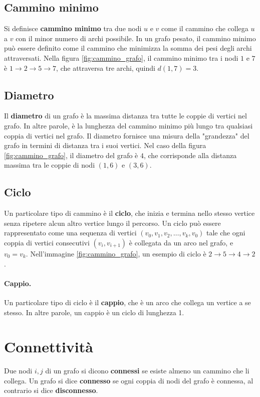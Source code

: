 \subsection{Cammino minimo} Si definisce \textbf{cammino minimo} tra due nodi \( u \) e \( v \) come il cammino che collega \( u \) a \( v \) con il minor numero di archi possibile. In un grafo pesato, il cammino minimo può essere definito come il cammino che minimizza la somma dei pesi degli archi attraversati. Nella figura \ref{fig:cammino_grafo}, il cammino minimo tra i nodi \(1\) e \(7\) è \(1 \to 2 \to 5 \to 7\), che attraversa tre archi, quindi $d(1, 7) = 3$.

\subsection{Diametro} Il \textbf{diametro} di un grafo è la massima distanza tra tutte le coppie di vertici nel grafo. In altre parole, è la lunghezza del cammino minimo più lungo tra qualsiasi coppia di vertici nel grafo. Il diametro fornisce una misura della "grandezza" del grafo in termini di distanza tra i suoi vertici. Nel caso della figura \ref{fig:cammino_grafo}, il diametro del grafo è \(4\), che corrisponde alla distanza massima tra le coppie di nodi \( (1, 6) \) e \( (3, 6) \).

\subsection{Ciclo}
Un particolare tipo di cammino è il \textbf{ciclo}, che inizia e termina nello stesso vertice senza ripetere alcun altro vertice lungo il percorso. Un ciclo può essere rappresentato come una sequenza di vertici \( (v_0, v_1, v_2, \ldots, v_k, v_0) \) tale che ogni coppia di vertici consecutivi \( (v_i, v_{i+1}) \) è collegata da un arco nel grafo, e \( v_0 = v_k \). Nell'immagine \ref{fig:cammino_grafo}, un esempio di ciclo è \(2 \to 5 \to 4 \to 2\).

\paragraph{Cappio.} Un particolare tipo di ciclo è il \textbf{cappio}, che è un arco che collega un vertice a se stesso. In altre parole, un cappio è un ciclo di lunghezza 1.

\section{Connettività}
Due nodi $i, j$ di un grafo si dicono \textbf{connessi} se esiste almeno un cammino che li collega. Un grafo si dice \textbf{connesso} se ogni coppia di nodi del grafo è connessa, al contrario si dice \textbf{disconnesso}.


